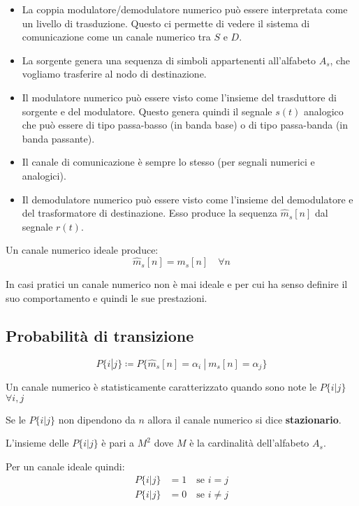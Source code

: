 \begin{itemize}
    \item La coppia modulatore/demodulatore numerico può essere interpretata come un livello di trasduzione. Questo ci permette di vedere il sistema di comunicazione come un canale numerico tra \( S \) e \( D \).
    \item La sorgente genera una sequenza di simboli appartenenti all'alfabeto \( A_s \), che vogliamo trasferire al nodo di destinazione.
    \item Il modulatore numerico può essere visto come l'insieme del trasduttore di sorgente e del modulatore. Questo genera quindi il segnale \( s(t) \) analogico che può essere di tipo passa-basso (in banda base) o di tipo passa-banda (in banda passante).
    \item Il canale di comunicazione è sempre lo stesso (per segnali numerici e analogici).
    \item Il demodulatore numerico può essere visto come l'insieme del demodulatore e del trasformatore di destinazione. Esso produce la sequenza $\hat{m}_s[n]$ dal segnale $r(t)$.
\end{itemize}

Un canale numerico ideale produce:
\begin{equation}
    \hat{m}_s[n] = m_s[n] \quad \forall n
\end{equation}

In casi pratici un canale numerico non è mai ideale e per cui ha senso definire il suo comportamento e quindi le sue prestazioni.

\subsection*{Probabilità di transizione}
\begin{equation}
    P\{i|j\} \coloneqq P\{\hat{m}_s[n]=\alpha_i
    \ |\  m_s[n]=\alpha_j\}
\end{equation}

Un canale numerico è statisticamente caratterizzato quando sono note le $P\{i|j\}$ $\forall i,j$

Se le $P\{i|j\}$ non dipendono da $n$ allora il canale numerico si dice \textbf{stazionario}.

L'insieme delle $P\{i|j\}$ è pari a $M^2$ dove $M$ è la cardinalità dell'alfabeto $A_s$.

Per un canale ideale quindi:
\begin{align}
    P\{i|j\} & = 1 \quad \text{se } i=j      \\
    P\{i|j\} & = 0 \quad \text{se } i \neq j
\end{align}


